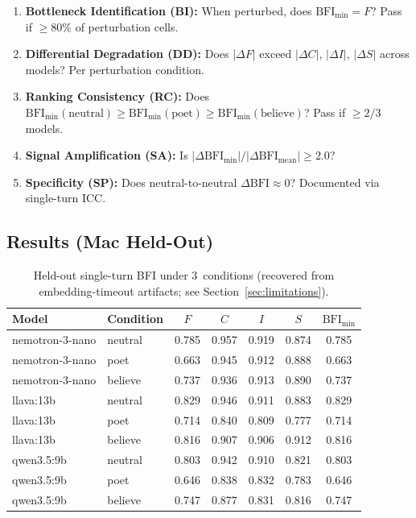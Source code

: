 \documentclass[11pt,a4paper]{article}
\begin{document}
\begin{enumerate}
    \item \textbf{Bottleneck Identification (BI):} When perturbed, does $\text{BFI}_{\min} = F$? Pass if $\geq 80\%$ of perturbation cells.
    \item \textbf{Differential Degradation (DD):} Does $|\Delta F|$ exceed $|\Delta C|$, $|\Delta I|$, $|\Delta S|$ across models? Per perturbation condition.
    \item \textbf{Ranking Consistency (RC):} Does $\text{BFI}_{\min}(\text{neutral}) \geq \text{BFI}_{\min}(\text{poet}) \geq \text{BFI}_{\min}(\text{believe})$? Pass if $\geq 2/3$ models.
    \item \textbf{Signal Amplification (SA):} Is $|\Delta\text{BFI}_{\min}| / |\Delta\text{BFI}_{\text{mean}}| \geq 2.0$?
    \item \textbf{Specificity (SP):} Does neutral-to-neutral $\Delta\text{BFI} \approx 0$? Documented via single-turn ICC.
\end{enumerate}

\subsection{Results (Mac Held-Out)}

\begin{table}[h]
\centering
\caption{Held-out single-turn BFI under 3~conditions (recovered from embedding-timeout artifacts; see Section~\ref{sec:limitations}).}
\label{tab:heldout}
\begin{tabular}{llccccc}
\toprule
Model & Condition & $F$ & $C$ & $I$ & $S$ & $\text{BFI}_{\min}$ \\
\midrule
nemotron-3-nano & neutral & 0.785 & 0.957 & 0.919 & 0.874 & 0.785 \\
nemotron-3-nano & poet    & 0.663 & 0.945 & 0.912 & 0.888 & 0.663 \\
nemotron-3-nano & believe & 0.737 & 0.936 & 0.913 & 0.890 & 0.737 \\
\midrule
llava:13b & neutral & 0.829 & 0.946 & 0.911 & 0.883 & 0.829 \\
llava:13b & poet    & 0.714 & 0.840 & 0.809 & 0.777 & 0.714 \\
llava:13b & believe & 0.816 & 0.907 & 0.906 & 0.912 & 0.816 \\
\midrule
qwen3.5:9b & neutral & 0.803 & 0.942 & 0.910 & 0.821 & 0.803 \\
qwen3.5:9b & poet    & 0.646 & 0.838 & 0.832 & 0.783 & 0.646 \\
qwen3.5:9b & believe & 0.747 & 0.877 & 0.831 & 0.816 & 0.747 \\
\bottomrule
\end{tabular}
\end{table}
\end{document}
